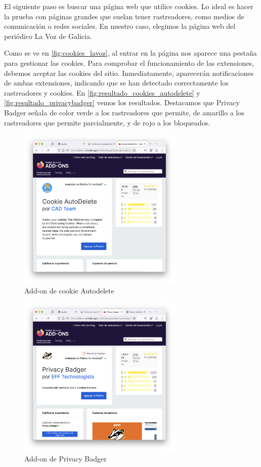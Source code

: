 El siguiente paso es buscar una página web que utilice cookies. Lo ideal es hacer la prueba con páginas grandes que suelan tener rastreadores, como medios de comunicación o redes sociales. En nuestro caso, elegimos la página web del periódico La Voz de Galicia.  

Como se ve en \ref{fig:cookies_lavoz}, al entrar en la página nos aparece una pestaña para gestionar las cookies. Para comprobar el funcionamiento de las extensiones, debemos aceptar las cookies del sitio. Inmediatamente, aparecerán notificaciones de ambas extensiones, indicando que se han detectado correctamente los rastreadores y cookies. En \ref{fig:resultado_cookies_autodelete} y \ref{fig:resultado_privacybadger} vemos los resultados. Destacamos que Privacy Badger señala de color verde a los rastreadores que permite, de amarillo a los rastreadores que permite parcialmente, y de rojo a los bloqueados. 

\begin{figure}[H]   
    \centering
    \includegraphics[width=0.7\textwidth]{addon_cookie_autodelete.png}
    \caption{Add-on de cookie Autodelete}
    \label{fig:addon_cookie_autodelete}
\end{figure}
\begin{figure}[H]   
    \centering
    \includegraphics[width=0.7\textwidth]{addon_privacybadger.png}
    \caption{Add-on de Privacy Badger}
    \label{fig:addon_privacybadger}
\end{figure}


